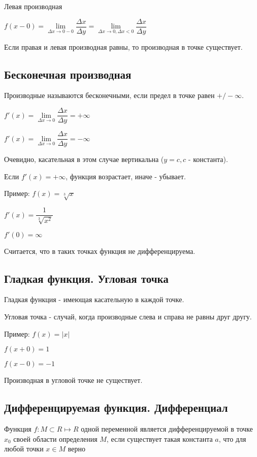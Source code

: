 Левая производная

$ f(x-0) = \lim\limits_{\Delta x \to 0-0} \dfrac{\Delta x}{\Delta y}
 = \lim\limits_{\Delta x \to 0, \Delta x < 0} \dfrac{\Delta x}{\Delta y} $

Если правая и левая производная равны, то производная в точке существует.


\subsection{Бесконечная производная}

Производные называются бесконечными, если предел в точке равен $ +/- \infty $.

$ f'(x) = \lim\limits_{\Delta x \to 0} \dfrac{\Delta x}{\Delta y} = + \infty $

$ f'(x) = \lim\limits_{\Delta x \to 0} \dfrac{\Delta x}{\Delta y} = - \infty $

Очевидно, касательная в этом случае вертикальна ($ y = c, c $ - константа).

Если $ f'(x) = + \infty $, функция возрастает, иначе - убывает.

Пример: $ f(x) = \sqrt[3]{x}$

$ f'(x) = \dfrac{1}{\sqrt[3]{x^{2}}}$

$f'(0) = \infty $

Считается, что в таких точках функция не дифференцируема.

\subsection{Гладкая функция. Угловая точка}

Гладкая функция - имеющая касательную в каждой точке.

Угловая точка - случай, когда производные слева и справа не равны друг другу.

Пример: $ f(x) = |x| $

$ f(x+0) = 1 $

$ f(x-0) = -1 $

Производная в угловой точке не существует.

\subsection{Дифференцируемая функция. Дифференциал}

Функция $f\colon M\subset R \mapsto R$ одной переменной является дифференцируемой в точке $x_0$ своей области определения $M$, если существует такая константа $a$, что для любой точки $x \in M$ верно

